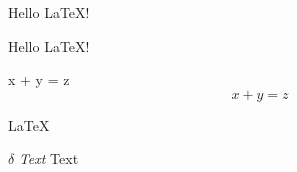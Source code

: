 \documentclass[a4paper,12pt]{article}
\begin{document}
    Hello \LaTeX!

    {\center Hello \LaTeX!}

    x + y = z
    \[ x + y = z \]
    
    {\center \LaTeX }

    {\center $\delta$ \emph{Text} Text }
\end{document}
